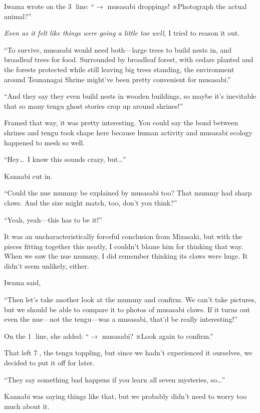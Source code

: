 \documentclass[
    a4paper,
    12pt,
    twoside,
    openany,
    UTF8,
    fontset=windows
]{ctexbook}
\begin{document}
Iwama wrote on the \textcircled{3} line: ``$\rightarrow$ musasabi droppings! ※Photograph the actual animal?''

\textit{Even as it felt like things were going a little too well,} I tried to reason it out.

``To survive, musasabi would need both---large trees to build nests in, and broadleaf trees for food. Surrounded by broadleaf forest, with cedars planted and the forests protected while still leaving big trees standing, the environment around Tsunanagai Shrine might've been pretty convenient for musasabi.''

``And they say they even build nests in wooden buildings, so maybe it's inevitable that so many tengu ghost stories crop up around shrines!''

Framed that way, it was pretty interesting. You could say the bond between shrines and tengu took shape here because human activity and musasabi ecology happened to mesh so well.

``Hey\dots\ I know this sounds crazy, but\dots''

Kannabi cut in.

``Could the nue mummy be explained by musasabi too? That mummy had sharp claws. And the size might match, too, don't you think?''

``Yeah, yeah---this has to be it!''

It was an uncharacteristically forceful conclusion from Mizasaki, but with the pieces fitting together this neatly, I couldn't blame him for thinking that way. When we saw the nue mummy, I did remember thinking its claws were huge. It didn't seem unlikely, either.

Iwama said,

``Then let's take another look at the mummy and confirm. We can't take pictures, but we should be able to compare it to photos of musasabi claws. If it turns out even the nue---not the tengu---was a musasabi, that'd be really interesting!''

On the \textcircled{1} line, she added: ``$\rightarrow$ musasabi? ※Look again to confirm.''

That left \textcircled{7}, the tengu toppling, but since we hadn't experienced it ourselves, we decided to put it off for later.

``They say something bad happens if you learn all seven mysteries, so\dots''

Kannabi was saying things like that, but we probably didn't need to worry too much about it.
\end{document}
